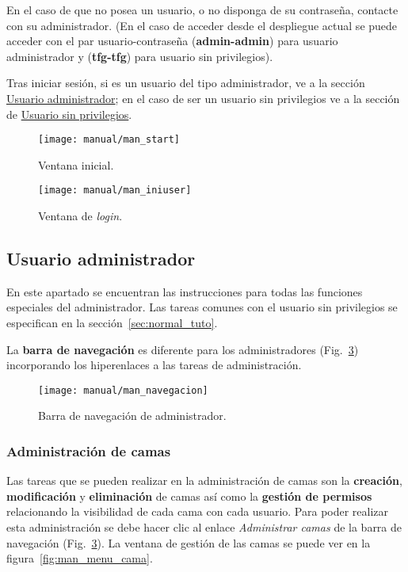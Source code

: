 En el caso de que no posea un usuario, o no disponga de su contraseña, contacte con su administrador. (En el caso de acceder desde el despliegue actual se puede acceder con el par usuario-contraseña (\textbf{admin-admin}) para usuario administrador y (\textbf{tfg-tfg}) para usuario sin privilegios).

Tras iniciar sesión, si es un usuario del tipo administrador, ve a la sección \hyperref[sec:admin_tuto]{Usuario administrador}; en el caso de ser un usuario sin privilegios ve a la sección de \hyperref[sec:normal_tuto]{Usuario sin privilegios}.

\begin{figure}
	\centering
	\texttt{[image: manual/man\_start]}
	\caption{Ventana inicial.}
	\label{fig:man_start}
\end{figure}
\begin{figure}
	\centering
	\texttt{[image: manual/man\_iniuser]}
	\caption{Ventana de \textit{login}.}
	\label{fig:man_inicio}
\end{figure}

\subsection{Usuario administrador}\label{sec:admin_tuto}

En este apartado se encuentran las instrucciones para todas las funciones especiales del administrador. Las tareas comunes con el usuario sin privilegios se especifican en la sección~\ref{sec:normal_tuto}.

La \textbf{barra de navegación} es diferente para los administradores (Fig.~\ref{fig:man_nav}) incorporando los hiperenlaces a las tareas de administración.

\begin{figure}
	\centering
	\texttt{[image: manual/man\_navegacion]}
	\caption{Barra de navegación de administrador.}
	\label{fig:man_nav}
\end{figure}

\subsubsection{Administración de camas}

Las tareas que se pueden realizar en la administración de camas son la \textbf{creación}, \textbf{modificación} y \textbf{eliminación} de camas así como la \textbf{gestión de permisos} relacionando la visibilidad de cada cama con cada usuario.  Para poder realizar esta administración se debe hacer clic al enlace \textit{Administrar camas} de la barra de navegación (Fig.~\ref{fig:man_nav}). La ventana de gestión de las camas se puede ver en la figura~\ref{fig:man_menu_cama}.

